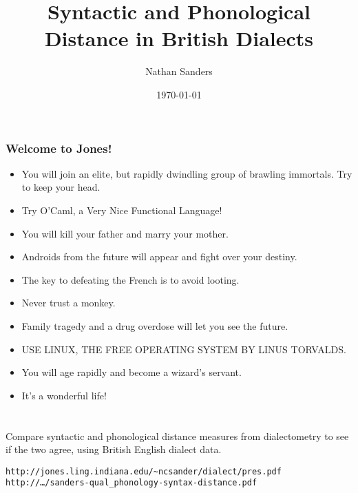 \documentclass{beamer}
\title{Syntactic and Phonological Distance in British Dialects}
\author{Nathan Sanders}
\date{\today}
\begin{document}
\begin{frame}
  \frametitle{Welcome to Jones!}

  \begin{itemize}
  \item You will join an elite, but rapidly dwindling group of brawling immortals. Try to keep your head.
  \item Try O'Caml, a Very Nice Functional Language!
  \item You will kill your father and marry your mother.
  \item  Androids from the future will appear and fight over your destiny.
  \item  The key to defeating the French is to avoid looting.
  \item  Never trust a monkey.
  \item  Family tragedy and a drug overdose will let you see the future.
  \item  USE LINUX, THE FREE OPERATING SYSTEM BY LINUS TORVALDS.
  \item You will age rapidly and become a wizard's servant.
  \item It's a wonderful life!
  \end{itemize}
\end{frame}

\frame{\titlepage}

\section[Outline]{}
\frame{\tableofcontents}
\begin{frame}
  Compare syntactic and phonological distance measures from
  dialectometry to see if the two agree, using British English dialect data.
  
  \vspace{2cm}

  {\tt http://jones.ling.indiana.edu/\~{}ncsander/dialect/pres.pdf}\\
  {\tt http://\ldots{}/sanders-qual\_phonology-syntax-distance.pdf}
\end{frame}
\end{document}
